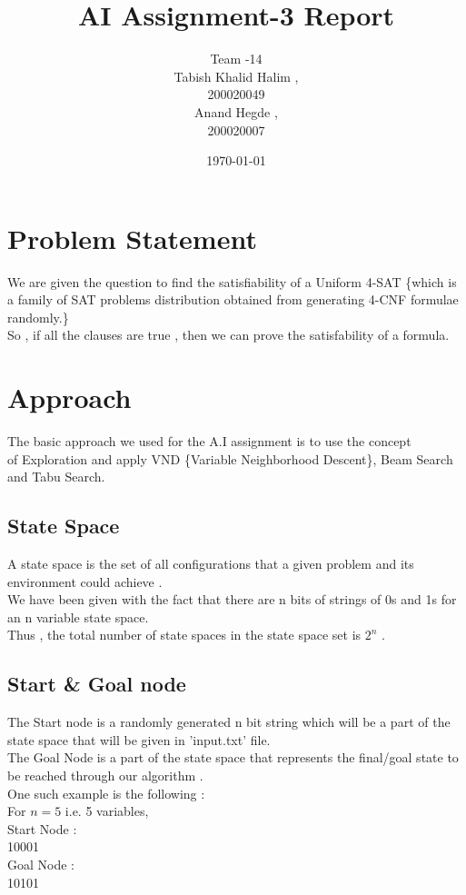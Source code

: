 \documentclass{article}
\title{AI Assignment-3 Report}
\date{\today}
\author{Team -14 \\Tabish Khalid Halim , \\ 200020049 \\ Anand Hegde , \\ 200020007}
\affil{Department of Computer Science, IIT Dharwad}
\begin{document}
\maketitle
{}
\newpage
\tableofcontents

\newpage
{}
\section{Problem Statement}
We are given the question to find the satisfiability of a Uniform 4-SAT \{which is a family of SAT problems distribution obtained from generating 4-CNF formulae randomly.\}
\\So , if all the clauses are true , then we can prove the satisfability of a formula.
\vspace{10pt}
\section{Approach}
The basic approach we used for the A.I assignment is to use the concept \\of Exploration and 
apply VND \{Variable Neighborhood Descent\}, Beam Search and Tabu Search.
\vspace{10pt}
\subsection*{State Space}
A state space is the set of all configurations that a given problem and its \\environment could achieve .
\vspace{10pt}
\\We have been given with the fact that there are n bits of strings of 0s and 1s for an n variable state space.
\\Thus , the total number of state spaces in the state space set is $2^n$ .
\subsection*{Start \& Goal node}
The Start node is a randomly generated n bit string which will be
a part of the state space that will be 
given in 'input.txt' file.
\\The Goal Node is a part of the state space that represents the final/goal state to be reached through
our algorithm .
\\One such example is the following :
\\For $n=5$ i.e. 5 variables,
\\Start Node :
\\10001
\\Goal Node :
\\10101
\newpage
\end{document}
